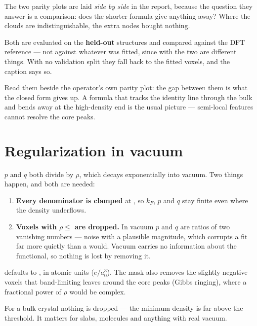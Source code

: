 The two parity plots are laid \emph{side by side} in the report, because the
question they answer is a comparison: does the shorter formula give anything
away? Where the clouds are indistinguishable, the extra nodes bought nothing.

Both are evaluated on the \textbf{held-out} structures and compared against the
DFT reference --- not against whatever was fitted, since with
 the two are different things. With no validation split they
fall back to the fitted voxels, and the caption says so.

Read them beside the operator's own parity plot: the gap between them is what
the closed form gives up. A formula that tracks the identity line through the
bulk and bends away at the high-density end is the usual picture --- semi-local
features cannot resolve the core peaks.

\section{Regularization in vacuum}
\label{sec:symbolic-vacuum}

$p$ and $q$ both divide by $\rho$, which decays exponentially into vacuum. Two
things happen, and both are needed:

\begin{enumerate}
  \item \textbf{Every denominator is clamped} at , so $k_F$, $p$
        and $q$ stay finite even where the density underflows.
  \item \textbf{Voxels with $\rho \le$  are dropped.} In vacuum
        $p$ and $q$ are ratios of two vanishing numbers --- noise with a
        plausible magnitude, which corrupts a fit far more quietly than a
         would. Vacuum carries no information about the functional, so
        nothing is lost by removing it.
\end{enumerate}

 defaults to , in atomic units ($e/a_0^3$). The mask also
removes the slightly negative voxels that band-limiting leaves around the core
peaks (Gibbs ringing), where a fractional power of $\rho$ would be complex.

\begin{ptip}
For a bulk crystal nothing is dropped --- the minimum density is far above the
threshold. It matters for slabs, molecules and anything with real vacuum.
\end{ptip}

